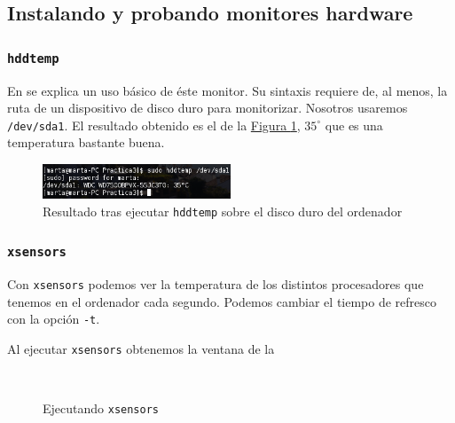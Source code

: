 \documentclass[10pt,a4paper,spanish]{article}
\numberwithin{equation}{section} %
\numberwithin{figure}{section} %
\numberwithin{table}{section} %
\begin{document}
\subsection{Instalando y probando monitores hardware}
\subsubsection{\texttt{hddtemp}}
En \cite{hddtemp} se explica un uso básico de éste monitor. Su sintaxis requiere de, al menos, la ruta de un dispositivo de disco duro para monitorizar. Nosotros usaremos \texttt{/dev/sda1}. El resultado obtenido es el de la \hyperref[hddtemp1]{Figura \ref*{hddtemp1}}, $35^{\circ}$ que es una temperatura bastante buena.

\begin{figure}[!h]
    \centering
    \includegraphics[width=0.5\textwidth]{16}
    \caption{Resultado tras ejecutar \texttt{hddtemp} sobre el disco duro del ordenador}
    \label{hddtemp1}
\end{figure}

\subsubsection{\texttt{xsensors}}
Con \texttt{xsensors} podemos ver la temperatura de los distintos procesadores que tenemos en el ordenador cada segundo. Podemos cambiar el tiempo de refresco con la opción \texttt{-t}.

Al ejecutar \texttt{xsensors} obtenemos la ventana de la 

\begin{figure}[!h]
\centering
\mbox {
\qquad
{}
}
\caption{Ejecutando \texttt{xsensors}}
\label{xsensors}
\end{figure}
\end{document}
